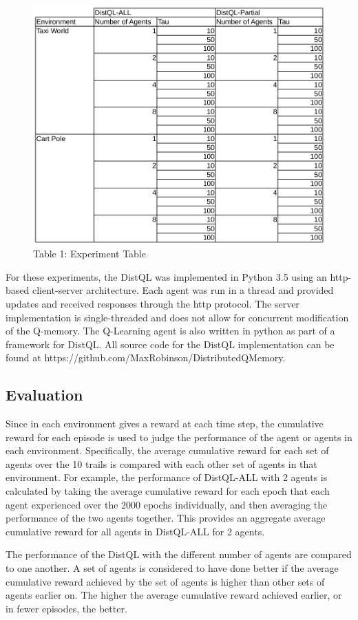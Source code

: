 \documentclass[jair,twoside,11pt,theapa]{article}
\begin{document}
\begin{figure}[h]
\centering
\includegraphics[width=0.7\linewidth]{ExperimentTable}
\caption*{Table 1: Experiment Table}
\label{fig:ExperimentTable}
\end{figure}

For these experiments, the DistQL was implemented in Python 3.5 using an http-based client-server architecture. Each agent was run in a thread and provided updates and received responses through the http protocol. The server implementation is single-threaded and does not allow for concurrent modification of the Q-memory. The Q-Learning agent is also written in python as part of a framework for DistQL. All source code for the DistQL implementation can be found at https://github.com/MaxRobinson/DistributedQMemory.

\subsection{Evaluation} 
\label{evaluation}
Since in each environment gives a reward at each time step, the cumulative reward for each episode is used to judge the performance of the agent or agents in each environment. Specifically, the average cumulative reward for each set of agents over the 10 trails is compared with each other set of agents in that environment. For example, the performance of DistQL-ALL with 2 agents is calculated by taking the average cumulative reward for each epoch that each agent experienced over the 2000 epochs individually, and then averaging the performance of the two agents together. This provides an aggregate average cumulative reward for all agents in DistQL-ALL for 2 agents. 

The performance of the DistQL with the different number of agents are compared to one another. A set of agents is considered to have done better if the average cumulative reward achieved by the set of agents is higher than other sets of agents earlier on. The higher the average cumulative reward achieved earlier, or in fewer episodes, the better.
\end{document}
